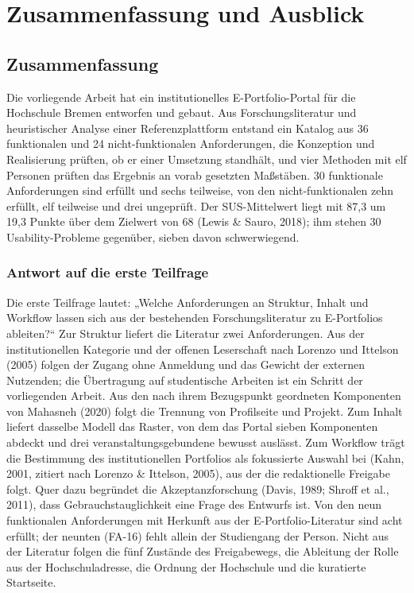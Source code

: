 
\chapter{Zusammenfassung und Ausblick}
\label{kap:zusammenfassung}

\section{Zusammenfassung}
\label{sec:gesamtzusammenfassung}

Die vorliegende Arbeit hat ein institutionelles E-Portfolio-Portal für die Hochschule Bremen entworfen und gebaut. Aus Forschungsliteratur und heuristischer Analyse einer Referenzplattform entstand ein Katalog aus 36 funktionalen und 24 nicht-funktionalen Anforderungen, die Konzeption und Realisierung prüften, ob er einer Umsetzung standhält, und vier Methoden mit elf Personen prüften das Ergebnis an vorab gesetzten Maßstäben. 30 funktionale Anforderungen sind erfüllt und sechs teilweise, von den nicht-funktionalen zehn erfüllt, elf teilweise und drei ungeprüft. Der SUS-Mittelwert liegt mit 87,3 um 19,3 Punkte über dem Zielwert von 68 (Lewis \& Sauro, 2018); ihm stehen 30 Usability-Probleme gegenüber, sieben davon schwerwiegend.

\subsection{Antwort auf die erste Teilfrage}
\label{subsec:antwort-tf1}

Die erste Teilfrage lautet: „Welche Anforderungen an Struktur, Inhalt und Workflow lassen sich aus der bestehenden Forschungsliteratur zu E-Portfolios ableiten?“ Zur Struktur liefert die Literatur zwei Anforderungen. Aus der institutionellen Kategorie und der offenen Leserschaft nach Lorenzo und Ittelson (2005) folgen der Zugang ohne Anmeldung und das Gewicht der externen Nutzenden; die Übertragung auf studentische Arbeiten ist ein Schritt der vorliegenden Arbeit. Aus den nach ihrem Bezugspunkt geordneten Komponenten von Mahasneh (2020) folgt die Trennung von Profilseite und Projekt. Zum Inhalt liefert dasselbe Modell das Raster, von dem das Portal sieben Komponenten abdeckt und drei veranstaltungsgebundene bewusst auslässt. Zum Workflow trägt die Bestimmung des institutionellen Portfolios als fokussierte Auswahl bei (Kahn, 2001, zitiert nach Lorenzo \& Ittelson, 2005), aus der die redaktionelle Freigabe folgt. Quer dazu begründet die Akzeptanzforschung (Davis, 1989; Shroff et al., 2011), dass Gebrauchstauglichkeit eine Frage des Entwurfs ist. Von den neun funktionalen Anforderungen mit Herkunft aus der E-Portfolio-Literatur sind acht erfüllt; der neunten (FA-16) fehlt allein der Studiengang der Person. Nicht aus der Literatur folgen die fünf Zustände des Freigabewegs, die Ableitung der Rolle aus der Hochschuladresse, die Ordnung der Hochschule und die kuratierte Startseite.

